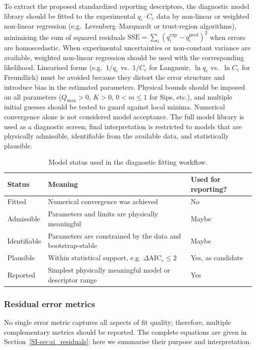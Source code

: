 \documentclass[journal=jacsat,manuscript=article]{achemso}
\begin{document}
	To extract the proposed standardized reporting descriptors, the diagnostic model library should be fitted to the experimental $q_e$--$C_e$ data by non-linear or weighted non-linear regression (e.g.\ Levenberg--Marquardt or trust-region algorithms), minimising the sum of squared residuals $\mathrm{SSE} = \sum_i (q_i^{\exp} - q_i^{\mathrm{pred}})^2$ when errors are homoscedastic. When experimental uncertainties or non-constant variance are available, weighted non-linear regression should be used with the corresponding likelihood. Linearised forms (e.g.\ $1/q_e$ vs.\ $1/C_e$ for Langmuir, $\ln q_e$ vs.\ $\ln C_e$ for Freundlich) must be avoided because they distort the error structure and introduce bias in the estimated parameters. Physical bounds should be imposed on all parameters ($Q_{\max} > 0$, $K > 0$, $0 < m \leq 1$ for Sips, etc.), and multiple initial guesses should be tested to guard against local minima.
Numerical convergence alone is not considered model acceptance. The full model library is used as a diagnostic screen; final interpretation is restricted to models that are physically admissible, identifiable from the available data, and statistically plausible.

\begin{table}[H]
\centering
\caption{Model status used in the diagnostic fitting workflow.}
\label{tab:model_status}
\small
\begin{tabular}{lll}
\hline
Status & Meaning & Used for reporting? \\
\hline
Fitted & Numerical convergence was achieved & No \\
Admissible & Parameters and limits are physically meaningful & Maybe \\
Identifiable & Parameters are constrained by the data and bootstrap-stable & Maybe \\
Plausible & Within statistical support, e.g. \(\Delta\mathrm{AIC}_c \leq 2\) & Yes, as candidate \\
Reported & Simplest physically meaningful model or descriptor range & Yes \\
\hline
\end{tabular}
\end{table}

	\subsubsection{Residual error metrics}
	\label{sec:error_metrics}

	No single error metric captures all aspects of fit quality; therefore, multiple complementary metrics should be reported. The complete equations are given in Section~\ref{SI-sec:si_residuals}; here we summarise their purpose and interpretation.
\end{document}
